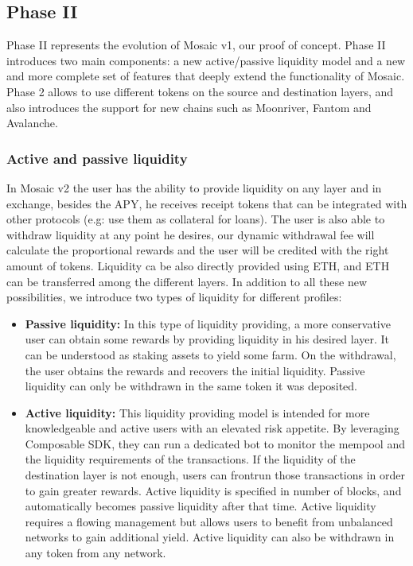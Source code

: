 \subsection{Phase II}
Phase II represents the evolution of Mosaic v1, our proof of concept. Phase II introduces two main components: a new active/passive liquidity model and a new and more complete set of features that deeply extend the functionality of Mosaic. Phase 2 allows to use different tokens on the source and destination layers, and also introduces the support for new chains such as Moonriver, Fantom and Avalanche.

\subsubsection*{Active and passive liquidity}
In Mosaic v2 the user has the ability to provide liquidity on any layer and in exchange, besides the APY, he receives receipt tokens that can be integrated with other protocols (e.g: use them as collateral for loans). The user is also able to withdraw liquidity at any point he desires, our dynamic withdrawal fee will calculate the proportional rewards and the user will be credited with the right amount of tokens. Liquidity ca be also directly provided using ETH, and ETH can be transferred among the different layers. In addition to all these new possibilities, we introduce two types of liquidity for different profiles:

    \begin{itemize}
        \item \textbf{Passive liquidity:} In this type of liquidity providing, a more conservative user can obtain some rewards by providing liquidity in his desired layer. It can be understood as staking assets to yield some farm.  On the withdrawal, the user obtains the rewards and recovers the initial liquidity. Passive liquidity can only be withdrawn in the same token it was deposited. 
        
        \item \textbf{Active liquidity:} This liquidity providing model is intended for more knowledgeable and active users with an elevated risk appetite. By leveraging Composable SDK, they can run a dedicated bot to monitor the mempool and  the liquidity requirements of the transactions. If the liquidity of the destination layer is not enough, users can frontrun those transactions in order to gain greater rewards. Active liquidity is specified in number of blocks, and automatically becomes passive liquidity after that time. Active liquidity requires a flowing management but allows users to benefit from unbalanced networks to gain additional yield. Active liquidity can also be withdrawn in any token from any network.
    \end{itemize}
    
